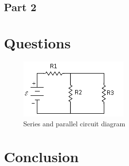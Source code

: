 \documentclass[titlepage]{article}
\begin{document}
        \subsection{Part 2} 


	\section{Questions}



    \begin{figure} 
        \centering
        \caption{Series and parallel circuit diagram}
        \includegraphics[scale = 1.2]{images/questions/circuit.png}


    \end{figure}

	\section{Conclusion}
\end{document}
